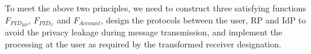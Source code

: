 To meet the above two principles, we need to construct three satisfying functions $F_{PID_{RP}}$, $F_{PID_{U}}$ and $F_{Account}$, design the protocols between the user, RP and IdP to avoid the privacy leakage during message transmission, and implement the  processing at the user as  required by the transformed receiver designation.










